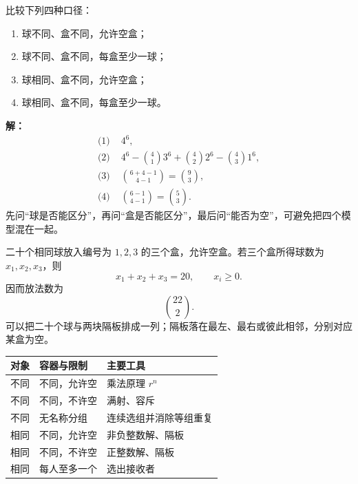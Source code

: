 \begin{examplebox}
  比较下列四种口径：
  \begin{enumerate}
    \item 球不同、盒不同，允许空盒；
    \item 球不同、盒不同，每盒至少一球；
    \item 球相同、盒不同，允许空盒；
    \item 球相同、盒不同，每盒至少一球。
  \end{enumerate}

  \textbf{解：}
  \begin{align*}
    \text{(1) }&4^6,\\
    \text{(2) }&4^6-\binom413^6+\binom422^6-\binom431^6,\\
    \text{(3) }&\binom{6+4-1}{4-1}=\binom93,\\
    \text{(4) }&\binom{6-1}{4-1}=\binom53.
  \end{align*}
  先问“球是否能区分”，再问“盒是否能区分”，最后问“能否为空”，可避免把四个模型混在一起。
\end{examplebox}

\begin{examplebox}
  二十个相同球放入编号为 $1,2,3$ 的三个盒，允许空盒。若三个盒所得球数为 $x_1,x_2,x_3$，则
  \[
    x_1+x_2+x_3=20,\qquad x_i\ge0.
  \]
  因而放法数为
  \[
    \binom{22}{2}.
  \]
  可以把二十个球与两块隔板排成一列；隔板落在最左、最右或彼此相邻，分别对应某盒为空。
\end{examplebox}

\begin{corollarybox}[模型选择表]
  \begin{center}
  \begin{tabular}{lll}
    \toprule
    对象 & 容器与限制 & 主要工具\\
    \midrule
    不同 & 不同，允许空 & 乘法原理 $r^n$\\
    不同 & 不同，不许空 & 满射、容斥\\
    不同 & 无名称分组 & 连续选组并消除等组重复\\
    相同 & 不同，允许空 & 非负整数解、隔板\\
    相同 & 不同，不许空 & 正整数解、隔板\\
    相同 & 每人至多一个 & 选出接收者\\
    \bottomrule
  \end{tabular}
  \end{center}
\end{corollarybox}

